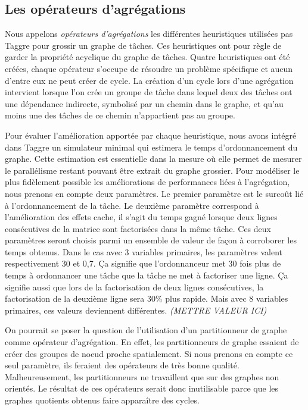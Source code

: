 \subsection{Les opérateurs d'agrégations}
Nous appelons {\em opérateurs d'agrégations} les différentes heuristiques utilisées pas Taggre pour grossir un graphe de tâches.
%
Ces heuristiques ont pour règle de garder la propriété acyclique du graphe de tâches.
%
Quatre heuristiques ont été créées, chaque opérateur s'occupe de résoudre un problème spécifique et aucun d'entre eux ne peut créer de cycle.
%
La création d'un cycle lors d'une agrégation intervient lorsque l'on crée un groupe de tâche dans lequel deux des tâches ont une dépendance indirecte, symbolisé par un chemin dans le graphe, et qu'au moins une des tâches de ce chemin n'appartient pas au groupe.


Pour évaluer l'amélioration apportée par chaque heuristique, nous avons intégré dans Taggre un simulateur minimal qui estimera le temps d'ordonnancement du graphe.
%
Cette estimation est essentielle dans la mesure où elle permet de mesurer le parallélisme restant pouvant être extrait du graphe grossier.
%
Pour modéliser le plus fidèlement possible les améliorations de performances liées à l'agrégation, nous prenons en compte deux paramètres.
%
Le premier paramètre est le surcoût lié à l'ordonnancement de la tâche.
%
Le deuxième paramètre correspond à l'amélioration des effets cache, il s'agit du temps gagné lorsque deux lignes consécutives de la matrice sont factorisées dans la même tâche.
%
Ces deux paramètres seront choisis parmi un ensemble de valeur de façon à corroborer les temps obtenus.
%
Dans le cas avec 3 variables primaires, les paramètres valent respectivement 30 et 0,7.
%
Ça signifie que l'ordonnanceur met 30 fois plus de temps à ordonnancer une tâche que la tâche ne met à factoriser une ligne.
%
Ça signifie aussi que lors de la factorisation de deux lignes consécutives, la factorisation de la deuxième ligne sera 30\% plus rapide.
%
Mais avec 8 variables primaires, ces valeurs deviennent différentes. {\em (METTRE VALEUR ICI)}%


On pourrait se poser la question de l'utilisation d'un partitionneur de graphe comme opérateur d'agrégation.
%
En effet, les partitionneurs de graphe essaient de créer des groupes de noeud proche spatialement.
%
Si nous prenons en compte ce seul paramètre, ils feraient des opérateurs de très bonne qualité.
%
Malheureusement, les partitionneurs ne travaillent que sur des graphes non orientés.
%
Le résultat de ces opérateurs serait donc inutilisable parce que les graphes quotients obtenus faire apparaître des cycles.
